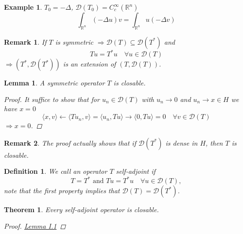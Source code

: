 \documentclass[12pt]{extreport} %
\newcommand{\R}{\mathbb{R}}
\newcommand{\DO}[1]{\mathcal{D}\left( {#1} \right)}
\theoremstyle{named}
\theoremstyle{nnamed}
\theoremstyle{itshape}
\newtheorem{definition}{Definition}  \counterwithin{definition}{chapter}
\newtheorem{theorem}{Theorem}  \counterwithin{theorem}{chapter}
\newtheorem{lemma}{Lemma}  \counterwithin{lemma}{chapter}
\theoremstyle{normal}
\newtheorem*{example}{Example}
\newtheorem*{remark}{Remark}
\begin{document}
\begin{example}
	$T_0 = - \Delta$, $\DO{T_0} = C_c^{\infty}(\R^n)$
	$$ \int_{\R^n} \left( - \Delta u \right) v = \int_{\R^n} u \left( - \Delta v \right) $$	
\end{example}

\begin{remark}
	If $T$ is symmetric $\Rightarrow \DO{T} \subseteq \DO{T^*}$ and
	$$ T u = T^* u \quad \forall u \in \DO{T} $$
	$\Rightarrow \left( T^*, \DO{T^*} \right)$ is an extension of $\left( T, \DO{T} \right)$.
\end{remark}

\begin{lemma} \label{I.1:lmm}
	A symmetric operator $T$ is closable.
	
	\begin{proof}
		It suffice to show that for $u_n \in \DO{T}$ with $u_n \rightarrow 0$ and $ u_n \rightarrow x \in H$ we have $x = 0$
		$$ \langle x,  v \rangle \leftarrow \langle T u_n, v \rangle = \langle u_n , T u \rangle \rightarrow \langle 0, T u \rangle = 0 \quad \forall v \in \DO{T}  $$
		$\Rightarrow x = 0$.
	\end{proof}
\end{lemma}

\begin{remark}
	The proof actually shows that if $\DO{T^*}$ is dense in $H$, then $T$ is closable.	
\end{remark}

\begin{definition}
	We call an operator $T$ self-adjoint if 
		$$ T = T^* \text{ and }  Tu = T^* u \quad \forall u \in \DO{T},  $$ %
	note that the first property implies that $\DO{T} = \DO{T^*}$.
\end{definition}

\begin{theorem}
	Every self-adjoint operator is closable.
	
	\begin{proof}
		\hyperref[I.1:lmm]{Lemma I.1}
	\end{proof}
\end{theorem}
\end{document}
